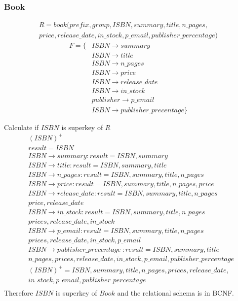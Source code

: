 \documentclass[fleqn]{scrreprt}
\begin{document}
\subsubsection{Book}
\begin{multline*}
    R = book(prefix, group, ISBN, summary, title, n\_pages,\\
    price, release\_date, in\_stock, p\_email, publisher\_percentage)
\end{multline*}
\begin{align*}
    F = \{ & ISBN \rightarrow summary\\
          & ISBN \rightarrow title\\
          & ISBN \rightarrow n\_pages\\
          & ISBN \rightarrow price\\
          & ISBN \rightarrow release\_date\\
          & ISBN \rightarrow in\_stock\\
          & publisher \rightarrow p\_email\\
          & ISBN \rightarrow publisher\_precentage\}
\end{align*}

Calculate if $ISBN$ is superkey of $R$
\begin{align*}
    & (ISBN)^+\\
    & result = ISBN\\
    & ISBN \rightarrow summary : result = ISBN, summary\\
    & ISBN \rightarrow title : result = ISBN, summary, title\\
    & ISBN \rightarrow n\_pages : result = ISBN, summary, title, n\_pages\\
    & ISBN \rightarrow price : result = ISBN, summary, title, n\_pages, price\\
    & ISBN \rightarrow release\_date : result = ISBN, summary, title, n\_pages\\
    & price, release\_date\\
    & ISBN \rightarrow in\_stock : result = ISBN, summary, title, n\_pages\\
    & prices, release\_date, in\_stock\\
    & ISBN \rightarrow p\_email : result = ISBN, summary, title, n\_pages\\
    & prices, release\_date, in\_stock, p\_email\\
    & ISBN \rightarrow publisher\_precentage\ : result = ISBN, summary, title\\
    & n\_pages, prices, release\_date, in\_stock, p\_email, publisher\_percentage\\
    & (ISBN)^+ = ISBN, summary, title, n\_pages, prices, release\_date,\\
    & in\_stock, p\_email, publisher\_percentage\\
\end{align*}
Therefore $ISBN$ is superkey of $Book$ and the relational schema is in BCNF.
\end{document}
